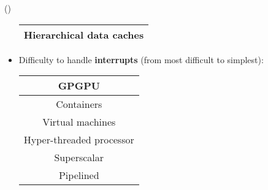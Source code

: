 \begin{theorem}{()}
\begin{itemize}
\begin{table}[H]
\begin{tabular}{|c|}
                Hierarchical data caches \\
                \hline
            \end{tabular}
        \end{table}
        \item Difficulty to handle \textbf{interrupts} (from most difficult to simplest): \begin{table}[H]
            \centering
            \begin{tabular}{|c|}
                \hline
                GPGPU \\
                \hline
                Containers \\
                \hline
                Virtual machines \\
                \hline
                Hyper-threaded processor \\
                \hline
                Superscalar \\
                \hline
                Pipelined \\
                \hline
            \end{tabular}
        \end{table}
    \end{itemize}
\end{theorem}
